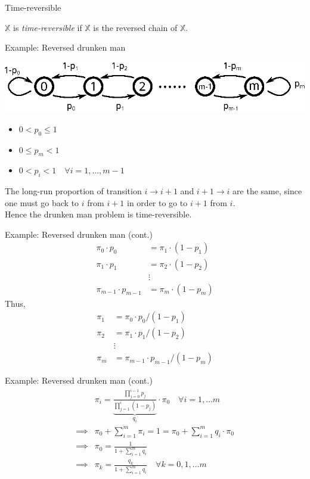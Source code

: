\documentclass[mathserif]{beamer}
\begin{document}
\begin{frame}{Time-reversible}
\begin{definition}
$\mathbb{X}$ is \textit{time-reversible} if $\mathbb{X}$ is the reversed chain of $\mathbb{X}$.
\end{definition}
\end{frame}

\begin{frame}{Example: Reversed drunken man}
\begin{center}
\includegraphics[scale=1.0]{drunken_man}
\end{center}
\begin{itemize}
\item $0 < p_0\leq 1$
\item $0\leq p_m < 1$
\item $0 < p_i < 1 \quad\forall i = 1,\ldots,m-1$
\end{itemize}
The long-run proportion of transition $i\to i+1$ and $i+1\to i$ are the same, since one must go back to $i$ from $i+1$ in order to go to $i+1$ from $i$.\\
Hence the drunken man problem is time-reversible.
\end{frame}

\begin{frame}{Example: Reversed drunken man (cont.)}
\begin{align*}
\pi_0\cdot p_0 &= \pi_1\cdot (1-p_1)\\
\pi_1\cdot p_1 &= \pi_2\cdot (1-p_2)\\
&\vdots \\
\pi_{m-1}\cdot p_{m-1} &= \pi_m\cdot (1-p_m)
\end{align*}
Thus,
\begin{align*}
\pi_1 & = \pi_0\cdot p_0/(1-p_1) \\
\pi_2 & = \pi_1\cdot p_1/(1-p_2) \\
& \vdots \\
\pi_m & = \pi_{m-1}\cdot p_{m-1}/(1-p_m)
\end{align*}
\end{frame}

\begin{frame}{Example: Reversed drunken man (cont.)}
\begin{align*}
& \pi_i = \underbrace{\frac{\prod_{j=0}^{i-1}p_j}{\prod_{j=1}^{i}(1-p_j)}}_{q_i}\cdot \pi_0 
	\quad\forall i=1,\ldots m \\
\implies & \pi_0 + \sum_{i=1}^m \pi_i = 1 = \pi_0 + \sum_{i=1}^m q_i\cdot \pi_0 \\
\implies & \pi_0 = \frac{1}{1 + \sum_{i=1}^m q_i} \\
\implies & \pi_k = \frac{q_k}{1 + \sum_{i=1}^m q_i} \quad\forall k=0,1,\ldots m
\end{align*}
\end{frame}
\end{document}

